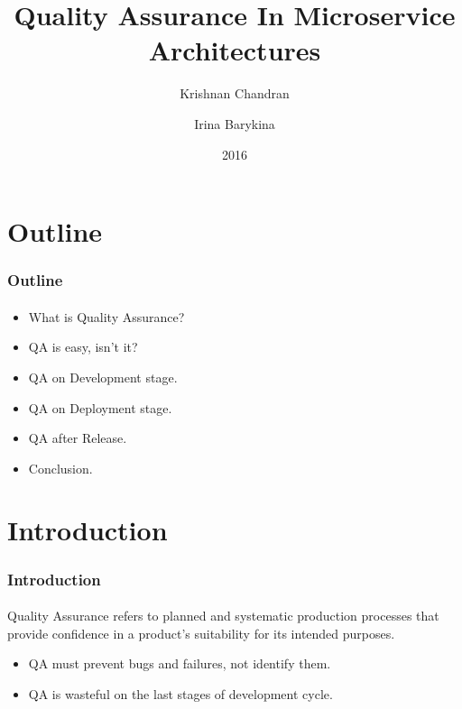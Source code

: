 \documentclass{beamer}
\title{Quality Assurance In Microservice Architectures}
\author{Krishnan Chandran \and Irina Barykina}
\institute[NYU]
{
Department of Informatics,\\
Intelligent Adaptive Systems, UHH\\
}
\date{2016}
\begin{document}
\begin{frame}
\titlepage
\end{frame}


\section{Outline}
\begin{frame}
	\frametitle{Outline}	
	\framesubtitle{}
	\begin{itemize}
		\item What is Quality Assurance?
 		\item QA is easy, isn't it?
		\item QA on Development stage.
		\item QA on Deployment stage.
		\item QA after Release.
		\item Conclusion.
	\end{itemize}
\end{frame}

\section{Introduction}
\begin{frame}
	\frametitle{Introduction}	
	\framesubtitle{}

\begin{definition}
Quality Assurance refers to planned and systematic production processes that provide confidence in a product's suitability for its intended purposes. \cite{trott}
\end{definition}
	\begin{itemize}
 		\item QA must prevent bugs and failures, not identify them.
		\item QA is wasteful on the last stages of development cycle.
	\end{itemize}
\end{frame}

\end{document}
